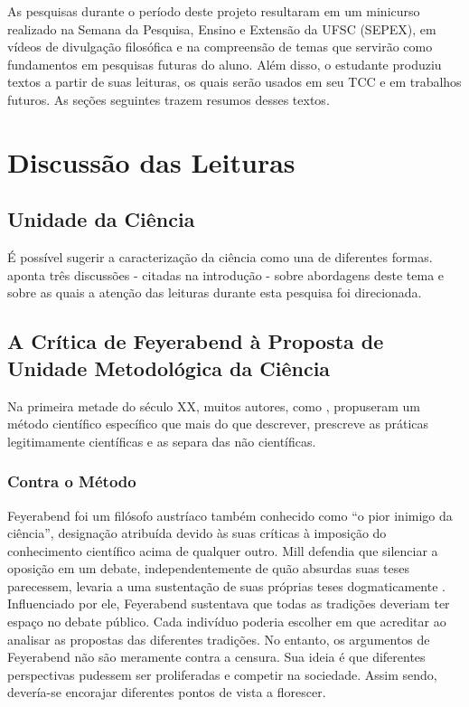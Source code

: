 \documentclass[12pt]{report}
\begin{document}
	As pesquisas durante o período deste projeto resultaram em um minicurso realizado na Semana da Pesquisa, Ensino e Extensão da UFSC (SEPEX), em vídeos de divulgação filosófica e na compreensão de temas que servirão como fundamentos em pesquisas futuras do aluno.
	Além disso, o estudante produziu textos a partir de suas leituras, os quais serão usados em seu TCC e em trabalhos futuros.
	As seções seguintes trazem resumos desses textos.
	
	\section{Discussão das Leituras}
	
	\subsection{Unidade da Ciência}
	
		É possível sugerir a caracterização da ciência como una de diferentes formas.
		\textcite{cunha-unidade} aponta três discussões - citadas na introdução - sobre abordagens deste tema e sobre as quais a atenção das leituras durante esta pesquisa foi direcionada.
		
	\subsection{A Crítica de Feyerabend à Proposta de Unidade Metodológica da Ciência}
		
		Na primeira metade do século XX, muitos autores, como \textcite{popper_conjeturas}, propuseram um método científico específico que mais do que descrever, prescreve as práticas legitimamente científicas e as separa das não científicas.
		
		\subsubsection{Contra o Método}
			
			Feyerabend foi um filósofo austríaco também conhecido como ``o pior inimigo da ciência'', designação atribuída devido às suas críticas à imposição do conhecimento científico acima de qualquer outro.
			Mill defendia que silenciar a oposição em um debate, independentemente de quão absurdas suas teses parecessem, levaria a uma sustentação de suas próprias teses dogmaticamente \cite{mill_liberty_2002}.
			Influenciado por ele, Feyerabend sustentava que todas as tradições deveriam ter espaço no debate público.
			Cada indivíduo poderia escolher em que acreditar ao analisar as propostas das diferentes tradições.
			No entanto, os argumentos de Feyerabend não são meramente contra a censura.
			Sua ideia é que diferentes perspectivas pudessem ser proliferadas e competir na sociedade.
			Assim sendo, devería-se encorajar diferentes pontos de vista a florescer.
			
\end{document}
